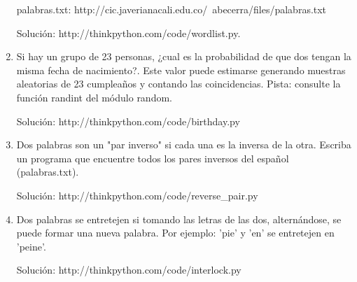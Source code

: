 \begin{enumerate}
  palabras.txt: 
  http://cic.javerianacali.edu.co/~abecerra/files/palabras.txt
  
  Solución: 
  http://thinkpython.com/code/wordlist.py.

  \item Si hay un grupo de 23 personas, ¿cual es la probabilidad de que dos tengan la misma fecha
  de nacimiento?. Este valor puede estimarse generando muestras aleatorias de 23 cumpleaños y 
  contando las coincidencias. Pista: consulte la función randint del módulo random.
  
  Solución: 
  http://thinkpython.com/code/birthday.py
  
  \item Dos palabras son un "par inverso" si cada una es la inversa de la otra. Escriba un programa
  que encuentre todos los pares inversos del español (palabras.txt).
  
  Solución: 
  http://thinkpython.com/code/reverse\_pair.py
  
  \item Dos palabras se entretejen si tomando las letras de las dos, alternándose, se puede formar
  una nueva palabra. Por ejemplo: 'pie' y 'en' se entretejen en 'peine'.
  
  Solución: http://thinkpython.com/code/interlock.py
\end{enumerate}